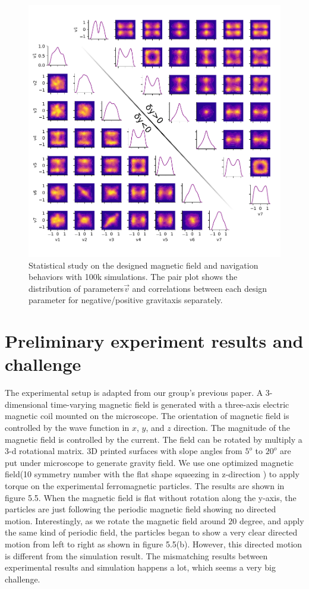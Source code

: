  
 \begin{figure}[p]
\centering
\includegraphics[width=16cm]{figures/5_4.pdf}
\caption{ Statistical study on the designed magnetic field and navigation behaviors with 100k simulations. The pair plot shows the distribution of parameters$\vec{v}$ and correlations between each design parameter for negative/positive gravitaxis separately.}
\label{fig:1}
\end{figure}
 
 
 
 \section{Preliminary experiment results and challenge}
 The experimental setup is adapted from our group's previous paper. \cite{fei2018magneto, fei2019magneto} A 3-dimensional time-varying magnetic field is generated with a three-axis electric magnetic coil mounted on the microscope. The orientation of magnetic field is controlled by the wave function in $x$, $y$, and $z$ direction. The magnitude of the magnetic field is controlled by the current. The field can be rotated by multiply a 3-d rotational matrix. 3D printed  surfaces with slope angles from $5^o$ to  $20^o$ are put under microscope to generate gravity field. We use one optimized magnetic field(10 symmetry number with the flat shape  squeezing in z-direction ) to apply torque on the experimental ferromagnetic particles. The results are shown in figure 5.5. When the magnetic field is flat without rotation along the y-axis, the particles are just following the periodic magnetic field showing no directed motion. Interestingly, as we rotate the magnetic field around $20$ degree, and apply the same kind of periodic field, the particles began to show a very clear directed motion from left to right as shown in figure 5.5(b). However, this directed motion is different from the simulation result. The mismatching results between experimental results and simulation happens a lot, which seems a very big challenge. 
 
